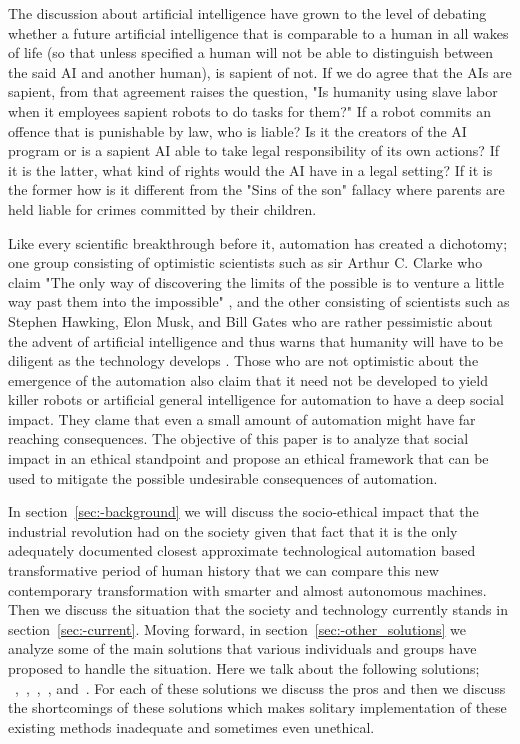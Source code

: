 The discussion about artificial intelligence have grown to the level of debating whether a future artificial intelligence that is comparable to a human in all wakes of life (so that unless specified a human will not be able to distinguish between the said AI and another human\cite{eyal1999turing}), is sapient of not. If we do agree that the AIs are sapient, from that agreement raises the question, "Is humanity using slave labor when it employees sapient robots to do tasks for them?" If a robot commits an offence that is punishable by law, who is liable? Is it the creators of the AI program or is a sapient AI able to take legal responsibility of its own actions? If it is the latter, what kind of rights would the AI have in a legal setting? If it is the former how is it different from the "Sins of the son" fallacy where parents are held liable for crimes committed by their children. 
 
Like every scientific breakthrough before it, automation has created a dichotomy; one group consisting of optimistic scientists such as sir Arthur C. Clarke who claim "The only way of discovering the limits of the possible is to venture a little way past them into the impossible" \cite{arthur1962limits}, and the other consisting of scientists such as Stephen Hawking, Elon Musk, and Bill Gates who are rather pessimistic about the advent of artificial intelligence and thus warns that humanity will have to be diligent as the technology develops \cite{michael2016warning}. Those who are not optimistic about the emergence of the automation also claim that it need not be developed to yield killer robots or artificial general intelligence \cite{luke2013agi} for automation to have a deep social impact. They clame that even a small amount of automation might have far reaching consequences.  The objective of this paper is to analyze that social impact in an ethical standpoint and propose an ethical framework that can be used to mitigate the possible undesirable consequences of automation. 

In section~\ref{sec:-background} we will discuss the socio-ethical impact that the industrial revolution had on the society given that fact that it is the only adequately documented closest approximate technological automation based transformative period of human history that we can compare this new contemporary transformation with smarter and almost autonomous machines. Then we discuss the situation that the society and technology currently stands in section~\ref{sec:-current}. Moving forward, in section~\ref{sec:-other_solutions}  we analyze some of the main solutions that various individuals and groups have proposed to handle the situation. Here we talk about the following solutions; ~,~,~,~, and~. For each of these solutions we discuss the pros and then we discuss the shortcomings of these solutions which makes solitary implementation of these existing methods inadequate and sometimes even unethical.

